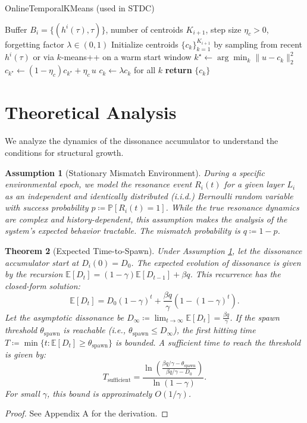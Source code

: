 \documentclass{article}
\newtheorem{theorem}{Theorem}[section]
\newtheorem{assumption}[theorem]{Assumption}
\numberwithin{figure}{section}
\numberwithin{table}{section}
\numberwithin{algorithm}{section}
\begin{document}
\begin{algorithm}[h]
\caption{OnlineTemporalKMeans (used in STDC)}\label{alg:otkmeans}
\begin{algorithmic}[1]
\Require Buffer $B_i=\{(h^i(\tau), \tau)\}$, number of centroids $K_{i+1}$, step size $\eta_c>0$, forgetting factor $\lambda\in(0,1)$
\State Initialize centroids $\{c_k\}_{k=1}^{K_{i+1}}$ by sampling from recent $h^i(\tau)$ or via $k$-means++ on a warm start window
    \State $k^\star \leftarrow \arg\min_k \|u - c_k\|_2^2$ 
    \State $c_{k^\star} \leftarrow (1-\eta_c) c_{k^\star} + \eta_c\, u$ 
    \State $c_k \leftarrow \lambda c_k$ for all $k$ 
\EndFor
\State \textbf{return} $\{c_k\}$
\end{algorithmic}
\end{algorithm}

\section{Theoretical Analysis}
We analyze the dynamics of the dissonance accumulator to understand the conditions for structural growth.

\begin{assumption}[Stationary Mismatch Environment]
\label{ass:bernoulli}
During a specific environmental epoch, we model the resonance event $R_i(t)$ for a given layer $L_i$ as an independent and identically distributed (i.i.d.) Bernoulli random variable with success probability $p \coloneqq \mathbb{P}[R_i(t)=1]$. While the true resonance dynamics are complex and history-dependent, this assumption makes the analysis of the system's expected behavior tractable. The mismatch probability is $q \coloneqq 1-p$.
\end{assumption}

\begin{theorem}[Expected Time-to-Spawn]
\label{thm:spawn_time}
Under Assumption \ref{ass:bernoulli}, let the dissonance accumulator start at $D_i(0)=D_0$. The expected evolution of dissonance is given by the recursion $\mathbb{E}[D_t] = (1-\gamma)\mathbb{E}[D_{t-1}] + \beta q$. This recurrence has the closed-form solution:
\[
\mathbb{E}[D_t] = D_0(1-\gamma)^t + \frac{\beta q}{\gamma}\left(1-(1-\gamma)^t\right).
\]
Let the asymptotic dissonance be $D_\infty \coloneqq \lim_{t\to\infty} \mathbb{E}[D_t] = \frac{\beta q}{\gamma}$. If the spawn threshold $\theta_{\mathrm{spawn}}$ is reachable (i.e., $\theta_{\mathrm{spawn}} \le D_\infty$), the first hitting time $T \coloneqq \min\{t : \mathbb{E}[D_t] \ge \theta_{\mathrm{spawn}}\}$ is bounded. A sufficient time to reach the threshold is given by:
\[
T_{\mathrm{sufficient}} = \frac{\ln\left(\frac{\beta q/\gamma - \theta_{\mathrm{spawn}}}{\beta q/\gamma - D_0}\right)}{\ln(1-\gamma)}.
\]
For small $\gamma$, this bound is approximately $O(1/\gamma)$.
\end{theorem}
\begin{proof} See Appendix A for the derivation. \end{proof}
\end{document}
